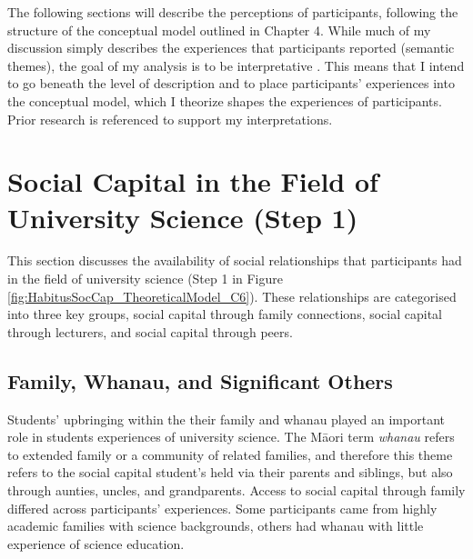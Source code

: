 The following sections will describe the perceptions of participants, following the structure of the conceptual model outlined in Chapter 4. While much of my discussion simply describes the experiences that participants reported (semantic themes), the goal of my analysis is to be interpretative \citep{Braun_2006}. This means that I intend to go beneath the level of description and to place participants' experiences into the conceptual model, which I theorize shapes the experiences of participants. Prior research is referenced to support my interpretations. 

\section{Social Capital in the Field of University Science (Step 1)}
This section discusses the availability of social relationships that participants had in the field of university science (Step 1 in Figure \ref{fig:HabitusSocCap_TheoreticalModel_C6}). These relationships are categorised into three key groups, social capital through family connections, social capital through lecturers, and social capital through peers. 

\subsection{Family, Whanau, and Significant Others}
Students' upbringing within the their family and whanau played an important role in students experiences of university science. The M\={a}ori term \textit{whanau} refers to extended family or a community of related families, and therefore this theme refers to the social capital student's held via their parents and siblings, but also through aunties, uncles, and grandparents. Access to social capital through family differed across participants' experiences. Some participants came from highly academic families with science backgrounds, others had whanau with little experience of science education. 

